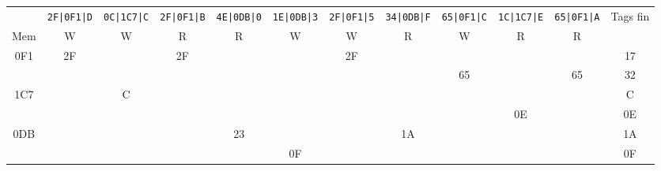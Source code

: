 \documentclass{article}
\begin{document}
\begin{tabular}{c|*{10}{c}|c|}
	    & \verb$2F|0F1|D$ & \verb$0C|1C7|C$ & \verb$2F|0F1|B$ & \verb$4E|0DB|0$ & \verb$1E|0DB|3$ & \verb$2F|0F1|5$ & \verb$34|0DB|F$ & \verb$65|0F1|C$ & \verb$1C|1C7|E$ & \verb$65|0F1|A$ & Tags fin \\
	Mem & W               & W               & R               & R               & W               & W               & R               & W               & R               & R               &          \\ \hline
	0F1 & 2F              &                 & 2F              &                 &                 & 2F              &                 &                 &                 &                 & 17       \\
	    &                 &                 &                 &                 &                 &                 &                 & 65              &                 & 65              & 32       \\ \hline
	1C7 &                 & C               &                 &                 &                 &                 &                 &                 &                 &                 & C        \\
	    &                 &                 &                 &                 &                 &                 &                 &                 & 0E              &                 & 0E       \\ \hline
	0DB &                 &                 &                 & 23              &                 &                 & 1A              &                 &                 &                 & 1A       \\
	    &                 &                 &                 &                 & 0F              &                 &                 &                 &                 &                 & 0F       \\ \hline
\end{tabular}
\vspace{5mm}\\
\end{document}
